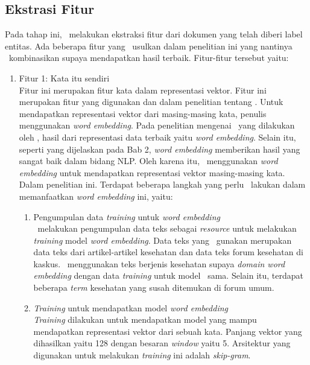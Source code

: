 \subsection{Ekstrasi Fitur}\label{subbab:fitur}
Pada tahap ini, \saya~melakukan ekstraksi fitur dari dokumen yang telah diberi label entitas. Ada beberapa fitur yang \saya~usulkan dalam penelitian ini yang nantinya \saya~kombinasikan supaya mendapatkan hasil terbaik. Fitur-fitur tersebut yaitu:
\begin{enumerate}
	\item Fitur 1: Kata itu sendiri\\
	Fitur ini merupakan fitur kata dalam representasi vektor. Fitur ini merupakan fitur yang digunakan \cite{abacha2011medical} dan \cite{skripsiKakRadit} dalam penelitian tentang \mer. Untuk mendapatkan representasi vektor dari masing-masing kata, penulis menggunakan \textit{word embedding}. Pada penelitian mengenai \mer~yang dilakukan oleh \cite{mujiono2016new}, hasil dari representasi data terbaik yaitu \textit{word embedding}. Selain itu, seperti yang dijelaskan pada Bab 2, \textit{word embedding} memberikan hasil yang sangat baik dalam bidang NLP. Oleh karena itu, \saya~menggunakan \textit{word embedding} untuk mendapatkan representasi vektor masing-masing kata. Dalam penelitian ini. Terdapat beberapa langkah yang perlu \saya~lakukan dalam memanfaatkan \textit{word embedding} ini, yaitu:
	\begin{enumerate}
		\item Pengumpulan data \textit{training} untuk \textit{word embedding}\\
		\Saya~melakukan pengumpulan data teks sebagai \textit{resource} untuk melakukan \textit{training} model \textit{word embedding}. Data teks yang \saya~gunakan merupakan data teks dari artikel-artikel kesehatan dan data teks forum kesehatan di kaskus. \Saya~menggunakan teks berjenis kesehatan supaya \textit{domain word embedding} dengan data \textit{training} untuk model \mer~sama. Selain itu, terdapat beberapa \textit{term} kesehatan yang susah ditemukan di forum umum.
		 
		\item \textit{Training} untuk mendapatkan model \textit{word embedding}\\
		\textit{Training} dilakukan untuk mendapatkan model yang mampu mendapatkan representasi vektor dari sebuah kata. Panjang vektor yang dihasilkan yaitu 128 dengan besaran \textit{window} yaitu 5. Arsitektur yang digunakan untuk melakukan \textit{training} ini adalah \textit{skip-gram}.
		

\end{enumerate}
\end{enumerate}
